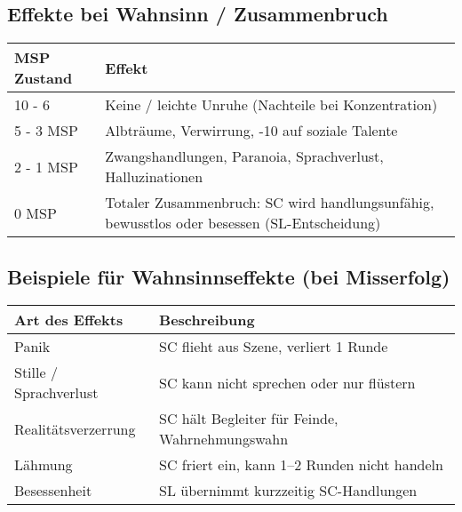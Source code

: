 \subsection{Effekte bei Wahnsinn / Zusammenbruch}
\begin{center}
\begin{tabular}{ll}
\toprule
\textbf{MSP Zustand} & \textbf{Effekt} \\ 
\midrule
10 - 6 & Keine / leichte Unruhe (Nachteile bei Konzentration) \\ 
\midrule
5 - 3 MSP & Albträume, Verwirrung, -10 auf soziale Talente \\ 
\midrule
2 - 1 MSP & Zwangshandlungen, Paranoia, Sprachverlust, Halluzinationen \\ 
\midrule
0 MSP & Totaler Zusammenbruch: SC wird handlungsunfähig, bewusstlos oder besessen (SL-Entscheidung) \\ 
\bottomrule
\end{tabular} 
\end{center}
\subsection{Beispiele für Wahnsinnseffekte (bei Misserfolg)}
\begin{center}
\begin{tabular}{ll}
\toprule 
\textbf{Art des Effekts} & \textbf{Beschreibung} \\ 
\midrule 
Panik & SC flieht aus Szene, verliert 1 Runde \\ 
\midrule 
Stille / Sprachverlust & SC kann nicht sprechen oder nur flüstern \\ 
\midrule 
Realitätsverzerrung & SC hält Begleiter für Feinde, Wahrnehmungswahn \\ 
\midrule 
Lähmung & SC friert ein, kann 1–2 Runden nicht handeln \\ 
\midrule 
Besessenheit & SL übernimmt kurzzeitig SC-Handlungen \\ 
\bottomrule 
\end{tabular} 
\end{center}
